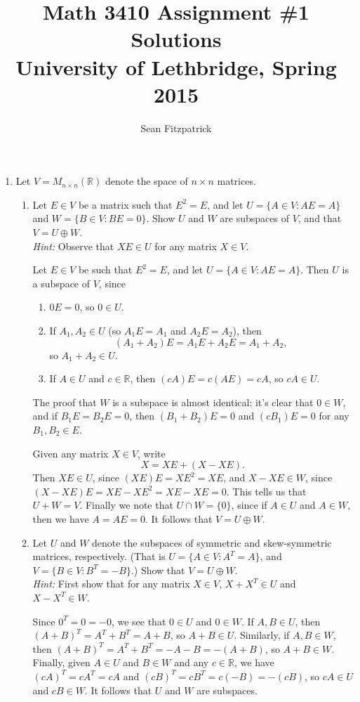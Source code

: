 \documentclass[letterpaper,12pt]{article}
\title{Math 3410 Assignment \#1 Solutions\\University of Lethbridge, Spring 2015}
\author{Sean Fitzpatrick}
\newcommand{\R}{\mathbb{R}}
\begin{document}
 \maketitle


\begin{enumerate}
 \item Let $V = M_{n\times n}(\R)$ denote the space of $n\times n$ matrices.
 \begin{enumerate}
 \item Let $E\in V$ be a matrix such that $E^2=E$, and let $U=\{A\in V : AE=A\}$ and $W = \{B\in V : BE = 0\}$. Show $U$ and $W$ are subspaces of $V$, and that $V=U\oplus W$.\\
 {\em Hint:} Observe that $XE\in U$ for any matrix $X\in V$.
 
 
 \bigskip
 
 Let $E\in V$ be such that $E^2=E$, and let $U=\{A\in V : AE=A\}$. Then $U$ is a subspace of $V$, since
 \begin{enumerate}
 \item $0E=0$, so $0\in U$.
 \item If $A_1,A_2\in U$ (so $A_1E=A_1$ and $A_2E=A_2$), then
 \[
 (A_1+A_2)E = A_1E+A_2E = A_1+A_2,
 \]
 so $A_1+A_2\in U$.
 \item If $A\in U$ and $c\in \R$, then $(cA)E = c(AE) = cA$, so $cA\in U$.
 \end{enumerate}
 The proof that $W$ is a subspace is almost identical: it's clear that $0\in W$, and if $B_1E=B_2E = 0$, then $(B_1+B_2)E=0$ and $(cB_1)E = 0$ for any $B_1,B_2\in E$.
 
 Given any matrix $X\in V$, write 
 \[
 X = XE+(X-XE).
 \]
 Then $XE\in U$, since $(XE)E = XE^2 = XE$, and $X-XE\in W$, since $(X-XE)E = XE-XE^2 = XE-XE=0$. This tells us that $U+W=V$. Finally we note that $U\cap W = \{0\}$, since if $A\in U$ and $A\in W$, then we have $A=AE=0$. It follows that $V=U\oplus W$.
 
 \item Let $U$ and $W$ denote the subspaces of symmetric and skew-symmetric matrices, respectively. (That is $U=\{A\in V : A^T=A\}$, and $V=\{B\in V : B^T = -B\}$.) Show that $V = U\oplus W$.\\
 {\em Hint:} First show that for any matrix $X\in V$, $X+X^T\in U$ and $X-X^T \in W$. 
 
 \bigskip
 
 Since $0^T = 0 = -0$, we see that $0\in U$ and $0\in W$. If $A,B\in U$, then $(A+B)^T = A^T+B^T = A+B$, so $A+B\in U$. Similarly, if $A,B\in W$, then $(A+B)^T = A^T+B^T = -A-B=-(A+B)$, so $A+B\in W$. Finally, given $A\in U$ and $B\in W$ and any $c\in \R$, we have $(cA)^T = cA^T=cA$ and $(cB)^T=cB^T = c(-B) = -(cB)$, so $cA\in U$ and $cB\in W$. It follows that $U$ and $W$ are subspaces.
 

\end{enumerate}
\end{enumerate}
\end{document}
